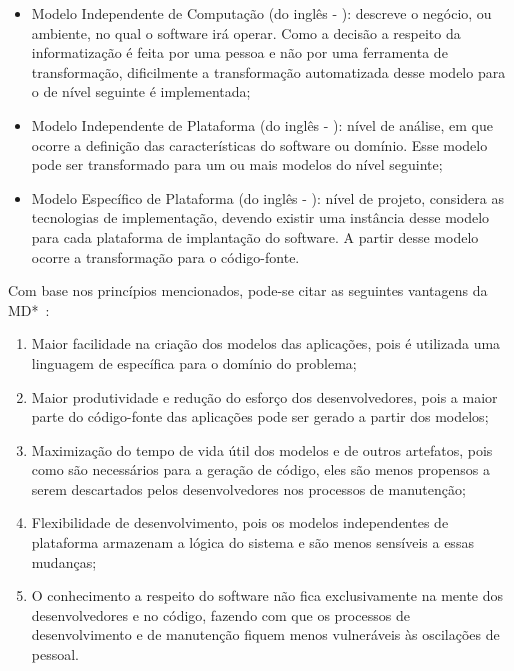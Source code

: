 \begin{itemize}
	\item Modelo Independente de Computação (do inglês - ): descreve o negócio, ou ambiente, no qual o software irá operar. Como a decisão a respeito da informatização é feita por uma pessoa e não por uma ferramenta de transformação, dificilmente a transformação automatizada desse modelo para o de nível seguinte é implementada;
	\item Modelo Independente de Plataforma (do inglês - ): nível de análise, em que ocorre a definição das características do software ou domínio. Esse modelo pode ser transformado para um ou mais modelos do nível seguinte;
	\item Modelo Específico de Plataforma (do inglês - ): nível de projeto, considera as tecnologias de implementação, devendo existir uma instância desse modelo para cada plataforma de implantação do software. A partir desse modelo ocorre a transformação para o código-fonte.
\end{itemize}

Com base nos princípios mencionados, pode-se citar as seguintes vantagens da MD*~\cite{Hutchinson_2011, France_2007, Schmidt_2006}:

\begin{enumerate}
	\item Maior facilidade na criação dos modelos das aplicações, pois é utilizada uma linguagem de específica para o domínio do problema;
	\item Maior produtividade e redução do esforço dos desenvolvedores, pois a maior parte do código-fonte das aplicações pode ser gerado a partir dos modelos;
	\item Maximização do tempo de vida útil dos modelos e de outros artefatos, pois como são necessários para a geração de código, eles são menos propensos a serem descartados pelos desenvolvedores nos processos de manutenção;
	\item Flexibilidade de desenvolvimento, pois os modelos independentes de plataforma armazenam a lógica do sistema e são menos sensíveis a essas mudanças;
	\item O conhecimento a respeito do software não fica exclusivamente na mente dos desenvolvedores e no código, fazendo com que os processos de desenvolvimento e de manutenção fiquem menos vulneráveis às oscilações de pessoal.
\end{enumerate}

